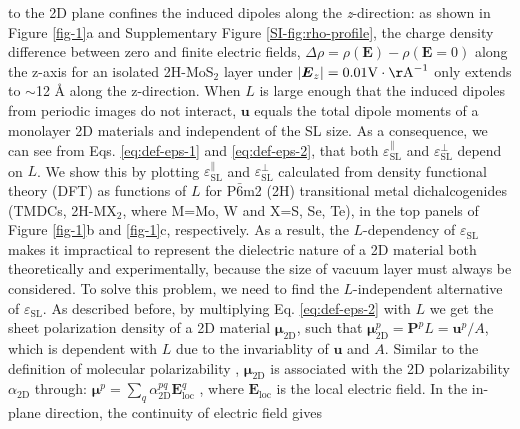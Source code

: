 \documentclass[journal=ancac3,manuscript=article,email=true,hyperref=true,keywords=false]{achemso}
\begin{document}
to the 2D plane confines the induced dipoles along the
\textit{z}-direction: as shown in Figure \ref{fig-1}a and
Supplementary Figure \ref{SI-fig:rho-profile}, the charge density difference
between zero and finite electric fields,
$\Delta \rho=\rho(\boldsymbol{E}) - \rho(\boldsymbol{E}=0)$ along the
z-axis for an isolated 2H-MoS$_{2}$ layer under
$|\boldsymbol{E}_{z}|=0.01 \mathrm{V\cdot \AA}^{-1}$ only extends to
$\sim{}$12 \AA{} along the z-direction. When $L$ is large enough that
the induced dipoles from periodic images do not interact,
$\boldsymbol{u}$ equals the total dipole moments of a monolayer 2D
materials and independent of the SL size. As a consequence, we can see
from Eqs. \ref{eq:def-eps-1} and \ref{eq:def-eps-2}, that both
$\varepsilon^{\parallel}_{\mathrm{SL}}$ and
$\varepsilon^{\perp}_{\mathrm{SL}}$ depend on $L$. We show this by
plotting $\varepsilon^{\parallel}_{\mathrm{SL}}$ and
$\varepsilon^{\perp}_{\mathrm{SL}}$ calculated from density functional
theory (DFT) as functions of $L$ for P$\bar{6}$m2 (2H) transitional
metal dichalcogenides (TMDCs, 2H-MX$_{2}$, where M=Mo, W and X=S, Se,
Te), in the top panels of Figure \ref{fig-1}b and \ref{fig-1}c,
respectively.
As a result, the $L$-dependency of $\varepsilon_{\mathrm{SL}}$ makes
it impractical to represent the dielectric nature of a 2D material
both theoretically and experimentally, because the size of vacuum
layer must always be considered. To solve this problem, we need to
find the $L$-independent alternative of
$\varepsilon_{\mathrm{SL}}$. As described before, by multiplying
Eq. \ref{eq:def-eps-2} with $L$ we get the sheet polarization density
of a 2D material $\boldsymbol{\mu}_{\mathrm{2D}}$, such that
$\boldsymbol{\mu}_{\mathrm{2D}}^{p} = \boldsymbol{P}^{p}L =
\boldsymbol{u}^{p}/A$, which is dependent with $L$ due to the invariablity
of $\boldsymbol{u}$ and $A$. Similar to the definition of molecular
polarizability \cite{Israelachvili_2011},
$\boldsymbol{\mu}_{\mathrm{2D}}$ is associated with the 2D
polarizability $\alpha_{\mathrm{2D}}$ through:
$\boldsymbol{\mu}^{p} = \sum_{q} \alpha_{\mathrm{2D}}^{pq}
\boldsymbol{E}_{\mathrm{loc}}^{q}$ \cite{T_bik_2004}, where
$\boldsymbol{E}_{\mathrm{loc}}$ is the local electric field. In the
in-plane direction, the continuity of electric field gives
\end{document}
